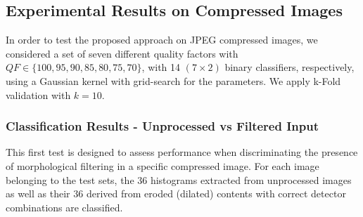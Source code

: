 \documentclass[review]{elsarticle}
\begin{document}
\subsection{Experimental Results on Compressed Images}
\label{sec:compr_res}


In order to test the proposed approach on JPEG compressed images, we considered a set of seven different quality factors with $QF \in \{100,95,90,85,80,75,70\}$, with 14 $(7\times 2)$ binary classifiers, respectively,
using a Gaussian kernel with grid-search for the parameters. We apply k-Fold validation with $k = 10$.

%

%


\subsubsection{Classification Results - Unprocessed vs Filtered Input}
This first test is designed to assess performance when discriminating the presence of morphological filtering in a specific compressed image. For each image belonging to the test sets, the $36$ histograms extracted from unprocessed images as well as their $36$ derived from eroded (dilated) contents with correct detector combinations are classified.
\end{document}
